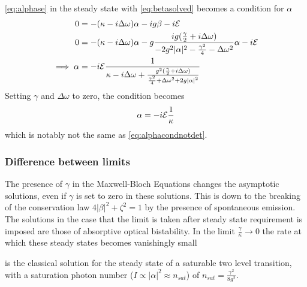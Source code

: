 \cref{eq:alphase} in the steady state with  \cref{eq:betasolved} becomes a condition for $\alpha$
\begin{align} %
0&=-(\kappa-i\Delta\omega)\alpha-ig\beta-i\Epsilon \\
0&=-{(\kappa-i\Delta\omega)}\alpha-g\frac{ig(\frac{\gamma}{2}+i\Delta\omega)}{-2g^2|\alpha|^2-\frac{\gamma^2}{4}-\Delta\omega^2}\alpha-i\Epsilon \\
\implies \alpha &= -i\Epsilon \frac{1}{\kappa-i\Delta\omega+\frac{g^2(\frac{\gamma}{2}+i\Delta\omega)}{\frac{\gamma^2}{4}+{\Delta\omega}^2+2g{|\alpha|}^2}}\label{eq:alphadetdiss}
\end{align}
Setting $\gamma$ and $\Delta\omega$ to zero, the condition becomes
\begin{equation}
  \alpha = -i\mathcal{E}\frac{1}{\kappa}
\end{equation}
which is notably not the same as \cref{eq:alphacondnotdet}.

\subsubsection{Difference between limits}\cite{Alsing1990}
  The presence of $\gamma$ in the Maxwell-Bloch Equations changes the asymptotic solutions, even if $\gamma$ is set to zero in these solutions. This is down to the breaking of the conservation law $4|\beta|^2 +\zeta^2 = 1$ by the presence of spontaneous emission. The solutions in the case that the limit is taken after steady state requirement is imposed are those of absorptive optical bistability. In the limit $\frac{\gamma}{\kappa} \rightarrow 0$ the rate at which these steady states becomes vanishingly small

 is the classical solution for the steady state of a saturable two level transition, with a saturation photon number ($I \propto |\alpha|^2 \approx n_{sat}$) of $n_{sat} = \frac{\gamma^2}{8g^2}$.

